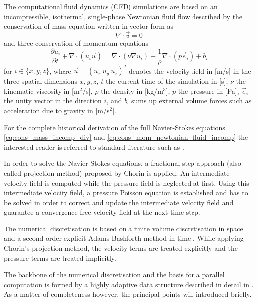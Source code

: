 \documentclass[10pt, conference]{IEEEtran}
\newcommand{\partAbl}[2]{\frac{\partial #1}{\partial #2}}
\begin{document}
The computational fluid dynamics (CFD) simulations are based on an incompressible, isothermal, single-phase Newtonian fluid flow described by the conservation of mass equation written in
vector form as
\begin{equation}
\label{eq:cons_mass_incomp_div}
\nabla \cdot \vec u = 0 
\end{equation}
and three conservation of momentum equations
\begin{equation}
\label{eq:cons_mom_newtonian_fluid_incomp}
\partAbl{u_i}{t} + \nabla \cdot (u_i \vec u) = \nabla \cdot \left( \nu \nabla u_i \right) - \frac{1}{\rho} \nabla \cdot \left(p \vec e_i \right) + b_i %
\end{equation}
for $i \in \{x,y,z\}$, where $\vec u  = (u_x ~ u_y ~ u_z)^T$ denotes the velocity field in [m/s] in the three spatial dimensions $x,y,z$, $t$ the current time of the simulation in [s], $\nu$ the kinematic
viscosity in [m$^2$/s], $\rho$ the density in [kg/m$^3$], $p$ the pressure in [Pa], $\vec e_i$ the unity vector in the direction $i$, and $b_i$ sums up external volume forces such as acceleration
due to gravity in [m/s$^2$].

For the complete historical derivation of the full Navier-Stokes equations \eqref{eq:cons_mass_incomp_div} and \eqref{eq:cons_mom_newtonian_fluid_incomp} the interested reader is referred
to standard literature such as \cite{Batchelor2000, Ferziger2002, Hirsch2007}.

In order to solve the Navier-Stokes equations, a fractional step approach (also called projection method) proposed by Chorin \cite{Chorin1967} is applied. An intermediate velocity field is
computed while the pressure field is neglected at first. Using this intermediate velocity field, a pressure Poisson equation is established and has to be solved in order to correct and update the
intermediate velocity field and guarantee a convergence free velocity field at the next time step.

The numerical discretisation is based on a finite volume discretisation in space and a second order explicit Adams-Bashforth method in time \cite{Schwarz2011}. While applying Chorin's
projection method, the velocity terms are treated explicitly and the pressure terms are treated implicitly.

The backbone of the numerical discretisation and the basis for a parallel computation is formed by a highly adaptive data structure described in detail in \cite{Frisch2014SCPE}. As a matter of
completeness however, the principal points will introduced briefly.
\end{document}
